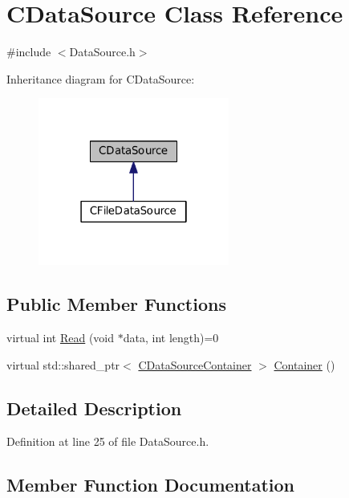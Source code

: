 \hypertarget{classCDataSource}{}\section{C\+Data\+Source Class Reference}
\label{classCDataSource}


{\ttfamily \#include $<$Data\+Source.\+h$>$}



Inheritance diagram for C\+Data\+Source\+:
\nopagebreak
\begin{figure}[H]
\begin{center}
\leavevmode
\includegraphics[width=178pt]{classCDataSource__inherit__graph}
\end{center}
\end{figure}
\subsection*{Public Member Functions}
\begin{DoxyCompactItemize}
\item 
virtual int \hyperlink{classCDataSource_ad94adc5076f973dcce83b73395eec86b}{Read} (void $\ast$data, int length)=0
\item 
virtual std\+::shared\+\_\+ptr$<$ \hyperlink{classCDataSourceContainer}{C\+Data\+Source\+Container} $>$ \hyperlink{classCDataSource_ada14cfe01c850d01b23c9b49d2f65efc}{Container} ()
\end{DoxyCompactItemize}


\subsection{Detailed Description}


Definition at line 25 of file Data\+Source.\+h.



\subsection{Member Function Documentation}
\hypertarget{classCDataSource_ada14cfe01c850d01b23c9b49d2f65efc}{}\label{classCDataSource_ada14cfe01c850d01b23c9b49d2f65efc} 

